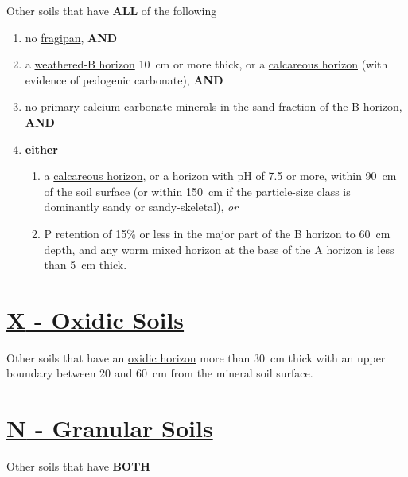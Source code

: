 \documentclass[
  letterpaper,
  DIV=11,
  numbers=noendperiod]{scrreprt}
\providecommand{\tightlist}{%
  \setlength{\itemsep}{0pt}\setlength{\parskip}{0pt}}\usepackage{longtable,booktabs,array}
\begin{document}
Other soils that have \textbf{ALL} of the following

\begin{enumerate}
\def\labelenumi{\arabic{enumi}.}
\tightlist
\item
  no \protect\hyperlink{sec-diag-fpan}{fragipan}, \textbf{AND}
\item
  a \protect\hyperlink{sec-diag-bw}{weathered-B horizon} 10~cm or more
  thick, or a \protect\hyperlink{sec-diag-calch}{calcareous horizon}
  (with evidence of pedogenic carbonate), \textbf{AND}
\item
  no primary calcium carbonate minerals in the sand fraction of the B
  horizon, \textbf{AND}
\item
  \textbf{either}

  \begin{enumerate}
  \def\labelenumii{(\alph{enumii})}
  \tightlist
  \item
    a \protect\hyperlink{sec-diag-calch}{calcareous horizon}, or a
    horizon with pH of 7.5 or more, within 90~cm of the soil surface (or
    within 150~cm if the particle-size class is dominantly sandy or
    sandy-skeletal), \emph{or}
  \item
    P retention of 15\% or less in the major part of the B horizon to
    60~cm depth, and any worm mixed horizon at the base of the A horizon
    is less than 5~cm thick.
  \end{enumerate}
\end{enumerate}

\hypertarget{sec-X}{%
\section{\texorpdfstring{\protect\hyperlink{sec-ord-X}{\textbf{X} -
Oxidic Soils}}{X - Oxidic Soils}}\label{sec-X}}

Other soils that have an \protect\hyperlink{sec-diag-oxh}{oxidic
horizon} more than 30~cm thick with an upper boundary between 20 and
60~cm from the mineral soil surface.

\hypertarget{sec-N}{%
\section{\texorpdfstring{\protect\hyperlink{sec-ord-N}{\textbf{N} -
Granular Soils}}{N - Granular Soils}}\label{sec-N}}

Other soils that have \textbf{BOTH}
\end{document}
